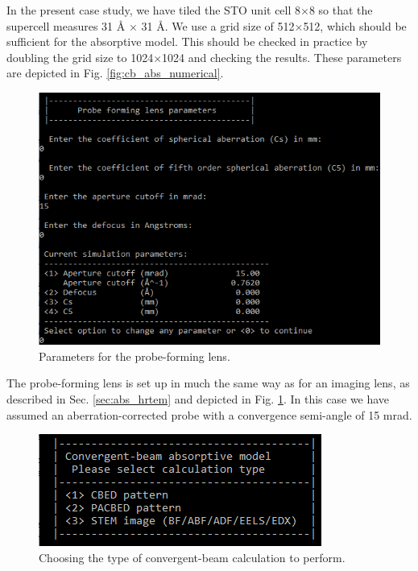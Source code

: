 \documentclass[12pt,a4paper]{article}
\newcommand{\by}{$\times$}
\begin{document}
In the present case study, we have tiled the STO unit cell 8\by8 so that the supercell measures 31 \AA{} \by{} 31 \AA{}.
We use a grid size of 512\by512, which should be sufficient for the absorptive model.
This should be checked in practice by doubling the grid size to 1024\by1024 and checking the results.
These parameters are depicted in Fig. \ref{fig:cb_abs_numerical}.

\begin{figure}[!h]
\begin{center}
    \includegraphics[scale=0.75]{cb_abs_lens.png}
\caption{Parameters for the probe-forming lens.}
\label{fig:cb_abs_lens}
\end{center}
\end{figure}

The probe-forming lens is set up in much the same way as for an imaging lens, as described in Sec. \ref{sec:abs_hrtem} and depicted in Fig. \ref{fig:cb_abs_lens}.
In this case we have assumed an aberration-corrected probe with a convergence semi-angle of 15 mrad.



\begin{figure}[!h]
\begin{center}
    \includegraphics[scale=0.75]{cb_abs_types.png}
\caption{Choosing the type of convergent-beam calculation to perform.}
\label{fig:cb_abs_types}
\end{center}
\end{figure}
\end{document}
